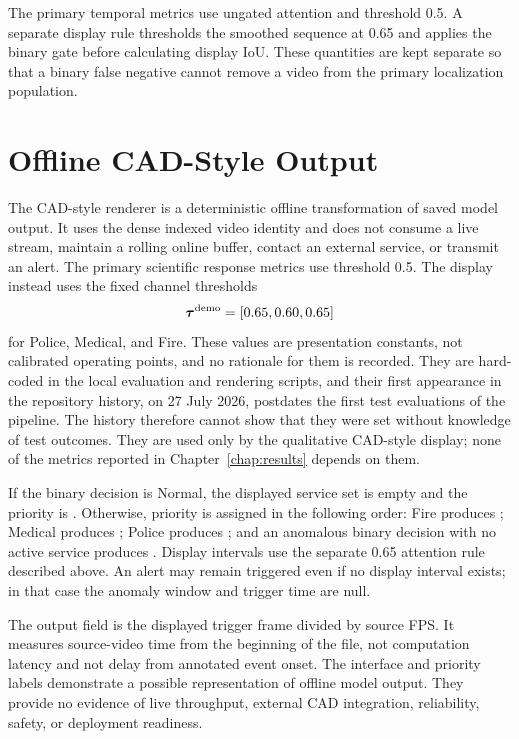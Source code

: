The primary temporal metrics use ungated attention and threshold 0.5. A separate display rule thresholds the smoothed sequence at 0.65 and applies the binary gate before calculating display IoU. These quantities are kept separate so that a binary false negative cannot remove a video from the primary localization population.

\section{Offline CAD-Style Output}
\label{sec:cad-output}

The CAD-style renderer is a deterministic offline transformation of saved model output. It uses the dense indexed video identity and does not consume a live stream, maintain a rolling online buffer, contact an external service, or transmit an alert. The primary scientific response metrics use threshold 0.5. The display instead uses the fixed channel thresholds
\begin{equation}
    \boldsymbol{\tau}^{\mathrm{demo}}=[0.65,0.60,0.65]
\end{equation}
for Police, Medical, and Fire. These values are presentation constants, not calibrated operating points, and no rationale for them is recorded. They are hard-coded in the local evaluation and rendering scripts, and their first appearance in the repository history, on 27 July 2026, postdates the first test evaluations of the pipeline. The history therefore cannot show that they were set without knowledge of test outcomes. They are used only by the qualitative CAD-style display; none of the metrics reported in Chapter~\ref{chap:results} depends on them.

If the binary decision is Normal, the displayed service set is empty and the priority is . Otherwise, priority is assigned in the following order: Fire produces ; Medical produces ; Police produces ; and an anomalous binary decision with no active service produces . Display intervals use the separate 0.65 attention rule described above. An alert may remain triggered even if no display interval exists; in that case the anomaly window and trigger time are null.

The output field  is the displayed trigger frame divided by source FPS. It measures source-video time from the beginning of the file, not computation latency and not delay from annotated event onset. The interface and priority labels demonstrate a possible representation of offline model output. They provide no evidence of live throughput, external CAD integration, reliability, safety, or deployment readiness.

